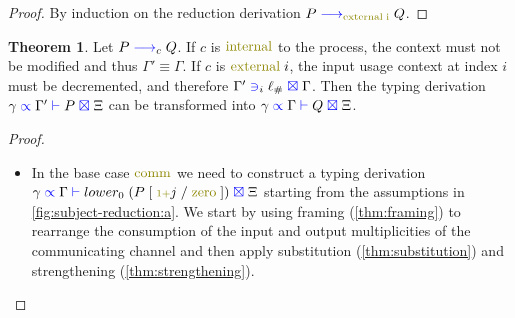 \documentclass[a4paper,UKenglish,cleveref, autoref, thm-restate,authorcolumns]{lipics-v2019}
\theoremstyle{definition}
\newtheorem{nitheorem}[theorem]{Theorem}
\newcommand{\type}[1]{\textcolor{blue}{\operatorname{#1}}}
\newcommand{\constr}[1]{\textcolor{olive}{\operatorname{#1}}}
\newcommand{\suc}{\constr{\scriptstyle 1+}}
\newcommand{\subst}[3]{#1 \; [ \; #2 \; / \;#3 \;]}
\newcommand{\lio}{\ell_{\#}}
\newcommand{\reduce}[1]{\; \type{\longrightarrow}_{#1} \;}
\newcommand{\types}[4]{#1 \; \type{\propto} \; #2 \; \type{\vdash} \; #3 \; \type{\boxtimes} \; #4}
\newcommand{\containsusage}[4]{#1 \; \type{\ni}_{#2} \; #3 \; \type{\boxtimes} \; #4}
\begin{document}
\begin{proof}
  By induction on the reduction derivation $P \reduce{\constr{external \; i}}Q$.
\end{proof}

\begin{nitheorem}
  Let $P \reduce{c} Q$.
  If $c$ is $\constr{internal}$ to the process, the context must not be modified and thus $\Gamma' \equiv \Gamma$.
  If $c$ is $\constr{external}\; i$, the input usage context at index $i$ must be decremented, and therefore $\containsusage{\Gamma'}{i}{\lio}{\Gamma}$.
  Then the typing derivation $\types{\gamma}{\Gamma'}{P}{\Xi}$ can be transformed into $\types{\gamma}{\Gamma}{Q}{\Xi}$.
\end{nitheorem}

\begin{proof}
  \hfill{}\\
  \begin{itemize}
    \item
    In the base case $\constr{comm}$ we need to construct a typing derivation $\types{\gamma}{\Gamma}{lower_0 \allowbreak \; (\subst{P}{\suc j}{\constr{zero}})}{\Xi}$ starting from the assumptions in \autoref{fig:subject-reduction:a}.
    We start by using framing (\autoref{thm:framing}) to rearrange the consumption of the input and output multiplicities of the communicating channel and then apply substitution (\autoref{thm:substitution}) and strengthening (\autoref{thm:strengthening}).


\end{itemize}
\end{proof}
\end{document}
